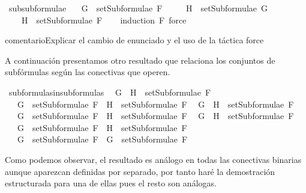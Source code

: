 \begin{isabellebody}
{\isafoldproof}%
%
\isadelimproof
\isanewline
%
\endisadelimproof
\isanewline
{}\isamarkupfalse%
\ subsubformulae{\isacharcolon}\ \isanewline
\ \ {\isachardoublequoteopen}G\ {\isasymin}\ setSubformulae\ F\ \isanewline
\ \ \ {\isasymLongrightarrow}\ H\ {\isasymin}\ setSubformulae\ G\ \isanewline
\ \ \ {\isasymLongrightarrow}\ H\ {\isasymin}\ setSubformulae\ F{\isachardoublequoteclose}\isanewline
%
\isadelimproof
\ \ %
\endisadelimproof
%
\isatagproof
{}\isamarkupfalse%
\ {\isacharparenleft}induction\ F{\isacharsemicolon}\ force{\isacharparenright}%
\endisatagproof
{\isafoldproof}%
%
\isadelimproof
%
\endisadelimproof
%
\begin{isamarkuptext}%
comentario{Explicar el cambio de enunciado y el uso de la táctica 
  force}%
\end{isamarkuptext}\isamarkuptrue%
%
\begin{isamarkuptext}%
A continuación presentamos otro resultado que relaciona los 
  conjuntos de subfórmulas según las conectivas que operen.%
\end{isamarkuptext}\isamarkuptrue%
\isamarkupfalse%
\ subformulas{\isacharunderscore}in{\isacharunderscore}subformulas{\isacharcolon}\isanewline
\ \ {\isachardoublequoteopen}G\ \isactrlbold {\isasymand}\ H\ {\isasymin}\ setSubformulae\ F\ \isanewline
\ \ {\isasymLongrightarrow}\ G\ {\isasymin}\ setSubformulae\ F\ {\isasymand}\ H\ {\isasymin}\ setSubformulae\ F{\isachardoublequoteclose}\isanewline
\ \ {\isachardoublequoteopen}G\ \isactrlbold {\isasymor}\ H\ {\isasymin}\ setSubformulae\ F\ \isanewline
\ \ {\isasymLongrightarrow}\ G\ {\isasymin}\ setSubformulae\ F\ {\isasymand}\ H\ {\isasymin}\ setSubformulae\ F{\isachardoublequoteclose}\isanewline
\ \ {\isachardoublequoteopen}G\ \isactrlbold {\isasymrightarrow}\ H\ {\isasymin}\ setSubformulae\ F\ \isanewline
\ \ {\isasymLongrightarrow}\ G\ {\isasymin}\ setSubformulae\ F\ {\isasymand}\ H\ {\isasymin}\ setSubformulae\ F{\isachardoublequoteclose}\isanewline
\ \ {\isachardoublequoteopen}\isactrlbold {\isasymnot}\ G\ {\isasymin}\ setSubformulae\ F\ {\isasymLongrightarrow}\ G\ {\isasymin}\ setSubformulae\ F{\isachardoublequoteclose}\isanewline
%
\isadelimproof
\ \ %
\endisadelimproof
%
\isatagproof
{}\isamarkupfalse%
%
\endisatagproof
{\isafoldproof}%
%
\isadelimproof
%
\endisadelimproof
%
\begin{isamarkuptext}%
Como podemos observar, el resultado es análogo en todas las 
  conectivas binarias aunque aparezcan definidas por separado, por tanto 
  haré la demostración estructurada para una de ellas pues el resto son 
  análogas. 


\end{isamarkuptext}
\end{isabellebody}
